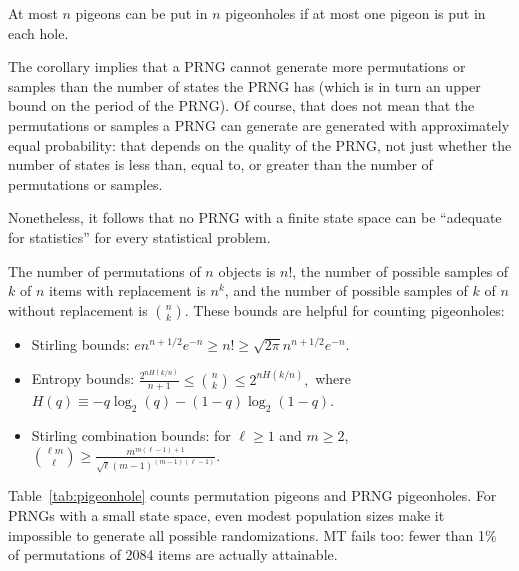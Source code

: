 \documentclass[graybox]{svmult}
\begin{document}
\begin{corollary}
At most $n$ pigeons can be put in $n$ pigeonholes if at most
one pigeon is put in each hole.
\end{corollary}

The corollary implies that a PRNG cannot generate more permutations or samples than the number of states the PRNG has (which is in turn an upper bound on the period of the PRNG).
Of course, that does not mean that the permutations or samples a PRNG can generate are generated with approximately equal probability: that depends on the quality of the PRNG, not just whether the number of states is less than, equal to, or greater than the number of permutations or samples.

Nonetheless, it follows that no PRNG with a finite state space can be ``adequate for statistics'' for every statistical problem.

The number of permutations of $n$ objects is $n!$, the number of possible samples of $k$ of $n$ items
with replacement is $n^k$,  and the number of possible samples of $k$ of $n$ without replacement is $n \choose k$.
These bounds are helpful for counting pigeonholes:
\begin{itemize}
\item Stirling bounds: $ e n^{n+1/2} e^{-n} \ge n! \ge \sqrt{2 \pi} n^{n+1/2} e^{-n}.$
\item Entropy bounds:
$ \frac{2^{nH(k/n)}}{n+1} \le {n \choose k} \le 2^{nH(k/n)},$ where $H(q) \equiv -q \log_2(q) - (1-q) \log_2 (1-q)$.
\item Stirling combination bounds:
for $\ell \ge 1$ and $m \ge 2$, $ { {\ell m } \choose { \ell }} \ge \frac{m^{m(\ell-1)+1}}{\sqrt{\ell} (m-1)^{(m-1)(\ell-1)}}. $
\end{itemize}

Table~\ref{tab:pigeonhole} counts permutation pigeons and PRNG pigeonholes.
For PRNGs with a small state space, even modest population sizes make it impossible to generate all possible randomizations.
MT fails too: fewer than 1\% of permutations of 2084 items are actually attainable.
\end{document}

